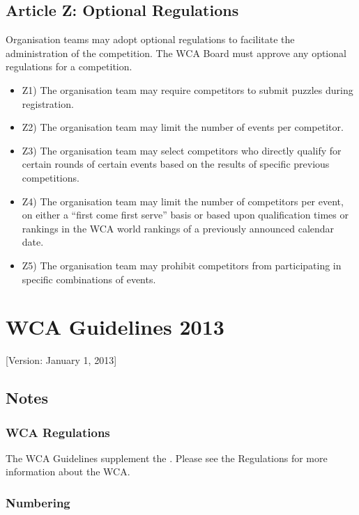 \subsection{ Article Z: Optional Regulations}

Organisation teams may adopt optional regulations to facilitate the
administration of the competition. The WCA Board must approve any
optional regulations for a competition.

\begin{itemize}
\item
  Z1) The organisation team may require competitors to submit puzzles
  during registration.
\item
  Z2) The organisation team may limit the number of events per
  competitor.
\item
  Z3) The organisation team may select competitors who directly qualify
  for certain rounds of certain events based on the results of specific
  previous competitions.
\item
  Z4) The organisation team may limit the number of competitors per
  event, on either a ``first come first serve'' basis or based upon
  qualification times or rankings in the WCA world rankings of a
  previously announced calendar date.
\item
  Z5) The organisation team may prohibit competitors from participating
  in specific combinations of events.
\end{itemize}
\section{ WCA Guidelines 2013}

{[}Version: January 1, 2013{]}

\subsection{Notes}

\subsubsection{WCA Regulations}

The WCA Guidelines supplement the . Please see the Regulations for more
information about the WCA.

\subsubsection{Numbering}

